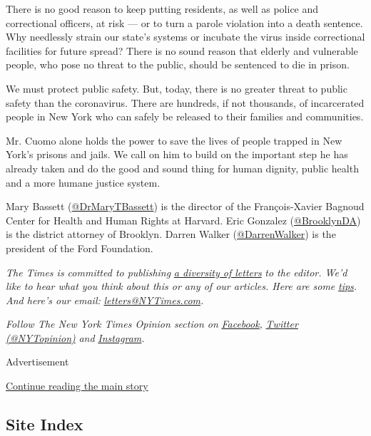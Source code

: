 There is no good reason to keep putting residents, as well as police and
correctional officers, at risk --- or to turn a parole violation into a
death sentence. Why needlessly strain our state's systems or incubate
the virus inside correctional facilities for future spread? There is no
sound reason that elderly and vulnerable people, who pose no threat to
the public, should be sentenced to die in prison.

We must protect public safety. But, today, there is no greater threat to
public safety than the coronavirus. There are hundreds, if not
thousands, of incarcerated people in New York who can safely be released
to their families and communities.

Mr. Cuomo alone holds the power to save the lives of people trapped in
New York's prisons and jails. We call on him to build on the important
step he has already taken and do the good and sound thing for human
dignity, public health and a more humane justice system.

Mary Bassett
(\href{https://twitter.com/DrMaryTBassett}{@DrMaryTBassett}) is the
director of the François-Xavier Bagnoud Center for Health and Human
Rights at Harvard. Eric Gonzalez
(\href{https://twitter.com/BrooklynDA}{@BrooklynDA}) is the district
attorney of Brooklyn. Darren Walker
(\href{https://twitter.com/darrenwalker?ref_src=twsrc\%5Egoogle\%7Ctwcamp\%5Eserp\%7Ctwgr\%5Eauthor}{@DarrenWalker})
is the president of the Ford Foundation.

\emph{The Times is committed to publishing}
\href{https://www.nytimes3xbfgragh.onion/2019/01/31/opinion/letters/letters-to-editor-new-york-times-women.html}{\emph{a
diversity of letters}} \emph{to the editor. We'd like to hear what you
think about this or any of our articles. Here are some}
\href{https://help.nytimes3xbfgragh.onion/hc/en-us/articles/115014925288-How-to-submit-a-letter-to-the-editor}{\emph{tips}}\emph{.
And here's our email:}
\href{mailto:letters@NYTimes.com}{\emph{letters@NYTimes.com}}\emph{.}

\emph{Follow The New York Times Opinion section on}
\href{https://www.facebookcorewwwi.onion/nytopinion}{\emph{Facebook}}\emph{,}
\href{http://twitter.com/NYTOpinion}{\emph{Twitter (@NYTopinion)}}
\emph{and}
\href{https://www.instagram.com/nytopinion/}{\emph{Instagram}}\emph{.}

Advertisement

\protect\hyperlink{after-bottom}{Continue reading the main story}

\hypertarget{site-index}{%
\subsection{Site Index}\label{site-index}}

